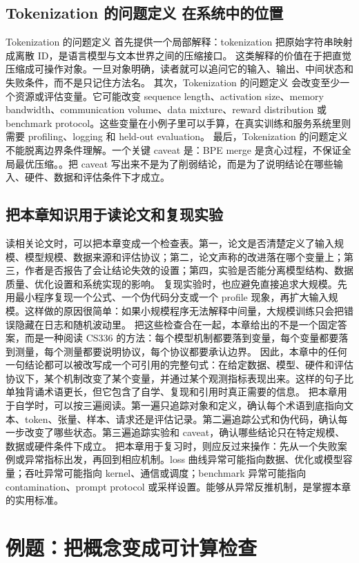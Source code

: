 \documentclass[a4paper]{article}
\begin{document}
\subsection{Tokenization 的问题定义 在系统中的位置}
Tokenization 的问题定义 首先提供一个局部解释：tokenization 把原始字符串映射成离散 ID，是语言模型与文本世界之间的压缩接口。 这类解释的价值在于把直觉压缩成可操作对象。一旦对象明确，读者就可以追问它的输入、输出、中间状态和失败条件，而不是只记住方法名。
其次，Tokenization 的问题定义 会改变至少一个资源或评估变量。它可能改变 sequence length、activation size、memory bandwidth、communication volume、data mixture、reward distribution 或 benchmark protocol。这些变量在小例子里可以手算，在真实训练和服务系统里则需要 profiling、logging 和 held-out evaluation。
最后，Tokenization 的问题定义 不能脱离边界条件理解。一个关键 caveat 是：BPE merge 是贪心过程，不保证全局最优压缩。。把 caveat 写出来不是为了削弱结论，而是为了说明结论在哪些输入、硬件、数据和评估条件下才成立。
\subsection{把本章知识用于读论文和复现实验}
读相关论文时，可以把本章变成一个检查表。第一，论文是否清楚定义了输入规模、模型规模、数据来源和评估协议；第二，论文声称的改进落在哪个变量上；第三，作者是否报告了会让结论失效的设置；第四，实验是否能分离模型结构、数据质量、优化设置和系统实现的影响。
复现实验时，也应避免直接追求大规模。先用最小程序复现一个公式、一个伪代码分支或一个 profile 现象，再扩大输入规模。这样做的原因很简单：如果小规模程序无法解释中间量，大规模训练只会把错误隐藏在日志和随机波动里。
把这些检查合在一起，本章给出的不是一个固定答案，而是一种阅读 CS336 的方法：每个模型机制都要落到变量，每个变量都要落到测量，每个测量都要说明协议，每个协议都要承认边界。
因此，本章中的任何一句结论都可以被改写成一个可引用的完整句式：在给定数据、模型、硬件和评估协议下，某个机制改变了某个变量，并通过某个观测指标表现出来。这样的句子比单独背诵术语更长，但它包含了自学、复现和引用时真正需要的信息。
把本章用于自学时，可以按三遍阅读。第一遍只追踪对象和定义，确认每个术语到底指向文本、token、张量、样本、请求还是评估记录。第二遍追踪公式和伪代码，确认每一步改变了哪些状态。第三遍追踪实验和 caveat，确认哪些结论只在特定规模、数据或硬件条件下成立。
把本章用于复习时，则应反过来操作：先从一个失败案例或异常指标出发，再回到相应机制。loss 曲线异常可能指向数据、优化或模型容量；吞吐异常可能指向 kernel、通信或调度；benchmark 异常可能指向 contamination、prompt protocol 或采样设置。能够从异常反推机制，是掌握本章的实用标准。
\section{例题：把概念变成可计算检查}
\end{document}
